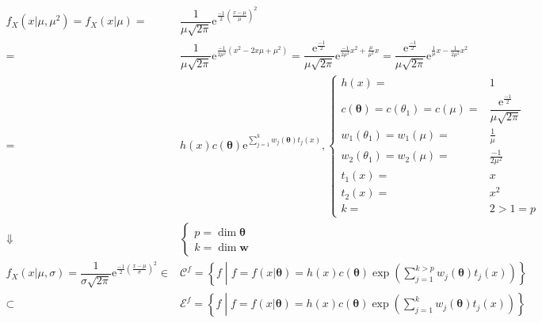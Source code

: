 \documentclass[
]{book}
\theoremstyle{definition}
\theoremstyle{definition}
\theoremstyle{definition}
\theoremstyle{definition}
\theoremstyle{remark}
\begin{document}
\[
\begin{aligned}
f_{{\scriptscriptstyle X}}\left(x|\mu,\mu^{2}\right)=f_{{\scriptscriptstyle X}}\left(x|\mu\right)= & \dfrac{1}{\mu\sqrt{2\pi}}\mathrm{e}^{\frac{-1}{2}\left(\frac{x-\mu}{\mu}\right)^{2}}\\
= & \dfrac{1}{\mu\sqrt{2\pi}}\mathrm{e}^{\frac{-1}{2\mu^{2}}\left(x^{2}-2x\mu+\mu^{2}\right)}=\dfrac{\mathrm{e}^{\frac{-1}{2}}}{\mu\sqrt{2\pi}}\mathrm{e}^{\frac{-1}{2\mu^{2}}x^{2}+\frac{\mu}{\mu^{2}}x}=\dfrac{\mathrm{e}^{\frac{-1}{2}}}{\mu\sqrt{2\pi}}\mathrm{e}^{\frac{1}{\mu}x-\frac{1}{2\mu^{2}}x^{2}}\\
= & h\left(x\right)c\left(\boldsymbol{\theta}\right)\mathrm{e}^{{\scriptscriptstyle \sum\limits _{j=1}^{k}w_{{\scriptscriptstyle j}}\left(\boldsymbol{\theta}\right)t_{{\scriptscriptstyle j}}\left(x\right)}},\begin{cases}
h\left(x\right)= & 1\\
c\left(\boldsymbol{\theta}\right)=c\left(\theta_{{\scriptscriptstyle 1}}\right)=c\left(\mu\right)= & \dfrac{\mathrm{e}^{\frac{-1}{2}}}{\mu\sqrt{2\pi}}\\
w_{{\scriptscriptstyle 1}}\left(\theta_{{\scriptscriptstyle 1}}\right)=w_{{\scriptscriptstyle 1}}\left(\mu\right)= & \frac{1}{\mu}\\
w_{{\scriptscriptstyle 2}}\left(\theta_{{\scriptscriptstyle 1}}\right)=w_{{\scriptscriptstyle 2}}\left(\mu\right)= & \frac{-1}{2\mu^{2}}\\
t_{{\scriptscriptstyle 1}}\left(x\right)= & x\\
t_{{\scriptscriptstyle 2}}\left(x\right)= & x^{2}\\
k= & 2>1=p
\end{cases}\\
\Downarrow & \begin{cases}
p=\dim\boldsymbol{\theta}\\
k=\dim\boldsymbol{w}
\end{cases}\\
f_{{\scriptscriptstyle X}}\left(x|\mu,\sigma\right)=\dfrac{1}{\sigma\sqrt{2\pi}}\mathrm{e}^{\frac{-1}{2}\left(\frac{x-\mu}{\sigma}\right)^{2}}\in & \mathcal{C}^{f}=\left\{ f\middle|f=f\left(x|\boldsymbol{\theta}\right)=h\left(x\right)c\left(\boldsymbol{\theta}\right)\exp\left(\sum\limits _{j=1}^{k>p}w_{{\scriptscriptstyle j}}\left(\boldsymbol{\theta}\right)t_{{\scriptscriptstyle j}}\left(x\right)\right)\right\} \\
\subset & \mathcal{E}^{f}=\left\{ f\middle|f=f\left(x|\boldsymbol{\theta}\right)=h\left(x\right)c\left(\boldsymbol{\theta}\right)\exp\left(\sum\limits _{j=1}^{k}w_{{\scriptscriptstyle j}}\left(\boldsymbol{\theta}\right)t_{{\scriptscriptstyle j}}\left(x\right)\right)\right\} 
\end{aligned}
\]
\end{document}
